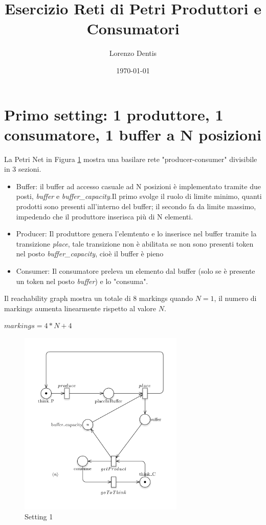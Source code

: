 \documentclass{article}
\begin{document}
\title{Esercizio Reti di Petri Produttori e Consumatori}
\author{Lorenzo Dentis}

\date{\today}

\maketitle

\section{Primo setting: 1 produttore, 1 consumatore, 1 buffer a N posizioni}\label{SEC:primo}
La Petri Net in Figura \ref{FIG:setting1} mostra una basilare rete "producer-consumer" divisibile in 3 sezioni.
\begin{itemize}
	\item Buffer: il buffer ad accesso casuale ad N posizioni è implementato tramite due posti, \emph{buffer} e \emph{buffer\_capacity}.Il primo svolge il ruolo di limite minimo, quanti prodotti sono presenti all'interno del buffer; il secondo fa da limite massimo, impedendo che il produttore inserisca più di N elementi.
	\item Producer: Il produttore genera l'elemtento e lo inserisce nel buffer tramite la transizione \emph{place}, tale transizione non è abilitata se non sono presenti token nel posto \emph{buffer\_capacity}, cioè il buffer è pieno
	\item Consumer: Il consumatore preleva un elemento dal buffer (solo se è presente un token nel posto \emph{buffer}) e lo "consuma".
\end{itemize}
Il reachability graph mostra un totale di 8 markings quando $N =1$, il numero di markings aumenta linearmente rispetto al valore $N$.\begin{center}$markings = 4*N + 4$\end{center}
\begin{figure}[!h]
\centering
\includegraphics[width=0.7\textwidth]{./Esercizio2_img/setting1.png}
\caption{Setting 1} \label{FIG:setting1}
\end{figure}
\end{document}
